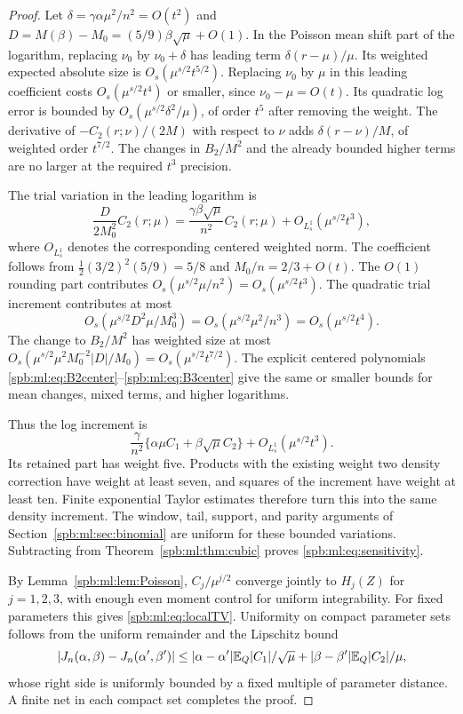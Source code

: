 \begin{proof}
Let $\delta=\gamma\alpha\mu^2/n^2=O(t^2)$ and
$D=M(\beta)-M_0=(5/9)\beta\sqrt\mu+O(1)$. In the Poisson mean shift part of the logarithm, replacing $\nu_0$ by $\nu_0+\delta$ has leading term $\delta(r-\mu)/\mu$. Its weighted expected absolute size is $O_s(\mu^{s/2}t^{5/2})$. Replacing $\nu_0$ by $\mu$ in this leading coefficient costs $O_s(\mu^{s/2}t^4)$ or smaller, since $\nu_0-\mu=O(t)$. Its quadratic log error is bounded by $O_s(\mu^{s/2}\delta^2/\mu)$, of order $t^5$ after removing the weight. The derivative of $-C_2(r;\nu)/(2M)$ with respect to $\nu$ adds $\delta(r-\nu)/M$, of weighted order $t^{7/2}$. The changes in $B_2/M^2$ and the already bounded higher terms are no larger at the required $t^3$ precision.

The trial variation in the leading logarithm is
\[
 \frac{D}{2M_0^2}C_2(r;\mu)
 =\frac{\gamma\beta\sqrt\mu}{n^2}C_2(r;\mu)
                  +O_{L^1_s}(\mu^{s/2}t^3),
\]
where $O_{L^1_s}$ denotes the corresponding centered weighted norm. The coefficient follows from
$\frac12(3/2)^2(5/9)=5/8$ and $M_0/n=2/3+O(t)$. The $O(1)$ rounding part contributes $O_s(\mu^{s/2}\mu/n^2)=O_s(\mu^{s/2}t^3)$. The quadratic trial increment contributes at most
\[
 O_s(\mu^{s/2}D^2\mu/M_0^3)
     =O_s(\mu^{s/2}\mu^2/n^3)=O_s(\mu^{s/2}t^4).
\]
The change to $B_2/M^2$ has weighted size at most
$O_s(\mu^{s/2}\mu^2M_0^{-2}|D|/M_0)
=O_s(\mu^{s/2}t^{7/2})$. The explicit centered polynomials \eqref{spb:ml:eq:B2center}--\eqref{spb:ml:eq:B3center} give the same or smaller bounds for mean changes, mixed terms, and higher logarithms.

Thus the log increment is
\[
 \frac{\gamma}{n^2}\{\alpha\mu C_1+\beta\sqrt\mu C_2\}
          +O_{L^1_s}(\mu^{s/2}t^3).
\]
Its retained part has weight five. Products with the existing weight two density correction have weight at least seven, and squares of the increment have weight at least ten. Finite exponential Taylor estimates therefore turn this into the same density increment. The window, tail, support, and parity arguments of Section~\ref{spb:ml:sec:binomial} are uniform for these bounded variations. Subtracting from Theorem~\ref{spb:ml:thm:cubic} proves \eqref{spb:ml:eq:sensitivity}.

By Lemma~\ref{spb:ml:lem:Poisson}, $C_j/\mu^{j/2}$ converge jointly to $H_j(Z)$ for $j=1,2,3$, with enough even moment control for uniform integrability. For fixed parameters this gives \eqref{spb:ml:eq:localTV}. Uniformity on compact parameter sets follows from the uniform remainder and the Lipschitz bound
\[
 |J_n(\alpha,\beta)-J_n(\alpha',\beta')|
 \le |\alpha-\alpha'|\mathbb E_Q|C_1|/\sqrt\mu+
        |\beta-\beta'|\mathbb E_Q|C_2|/\mu,
\]
whose right side is uniformly bounded by a fixed multiple of parameter distance. A finite net in each compact set completes the proof.
\end{proof}

